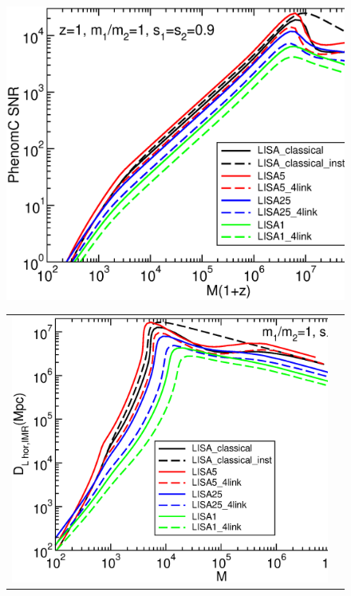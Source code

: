 \documentclass{iopart}
\begin{document}
%
\begin{figure}[H]
\begin{center}
\includegraphics[scale=0.33,clip=true]{FigEmanuele/SNRIMRSpin09.eps}\\
\begin{tabular}{cc}
\includegraphics[scale=0.33,clip=true]{FigEmanuele/DLIMRSpin09.eps}&

\end{tabular}
\end{center}
\end{figure}
\end{document}
